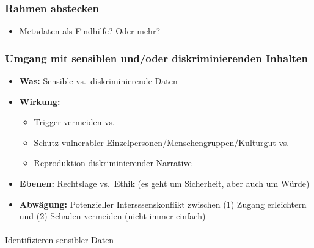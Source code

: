 \documentclass[
  letterpaper,
  DIV=11,
  numbers=noendperiod]{scrartcl}
\makeatletter
\let\oldparagraph\paragraph
\renewcommand{\paragraph}{
    \@ifstar
      \xxxParagraphStar
      \xxxParagraphNoStar
  }
\newcommand{\xxxParagraphStar}[1]{\oldparagraph*{#1}\mbox{}}
\newcommand{\xxxParagraphNoStar}[1]{\oldparagraph{#1}\mbox{}}
\providecommand{\tightlist}{%
  \setlength{\itemsep}{0pt}\setlength{\parskip}{0pt}}\usepackage{longtable,booktabs,array}
\makeatother
\begin{document}
\subsubsection{Rahmen abstecken}\label{rahmen-abstecken}

\begin{itemize}
\tightlist
\item
  Metadaten als Findhilfe? Oder mehr?
\end{itemize}

\subsubsection{Umgang mit sensiblen und/oder diskriminierenden
Inhalten}\label{umgang-mit-sensiblen-undoder-diskriminierenden-inhalten}

\begin{itemize}
\tightlist
\item
  \textbf{Was:} Sensible vs.~diskriminierende Daten
\item
  \textbf{Wirkung:}

  \begin{itemize}
  \tightlist
  \item
    Trigger vermeiden vs.
  \item
    Schutz vulnerabler Einzelpersonen/Menschengruppen/Kulturgut vs.~
  \item
    Reproduktion diskriminierender Narrative
  \end{itemize}
\item
  \textbf{Ebenen:} Rechtslage vs.~Ethik (es geht um Sicherheit, aber
  auch um Würde)
\item
  \textbf{Abwägung:} Potenzieller Intersssenskonflikt zwischen (1)
  Zugang erleichtern und (2) Schaden vermeiden (nicht immer einfach)
\end{itemize}

\paragraph{Identifizieren sensibler
Daten}\label{identifizieren-sensibler-daten}
\end{document}
